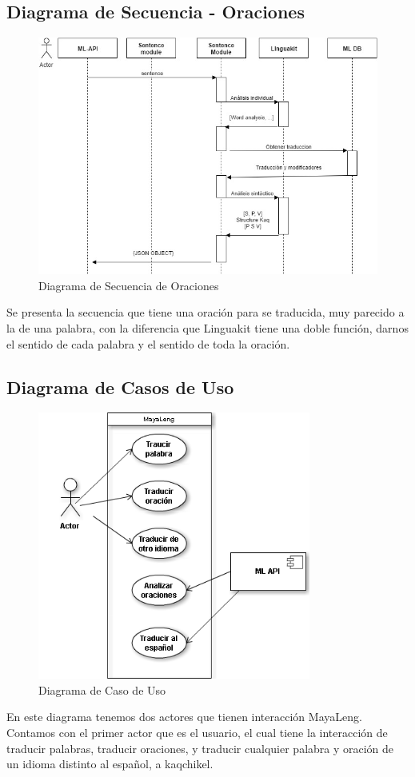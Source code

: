\documentclass[a4paper,openright,11pt]{article}
\begin{document}
\subsection{Diagrama de Secuencia - Oraciones}
\begin{figure}[H]
	\centering
	\includegraphics[width=1.1\textwidth]{secuenciaoracion}
	\caption{Diagrama de Secuencia de Oraciones}
	\label{fig:seco}
\end{figure}
Se presenta la secuencia que tiene una oración para se traducida, muy parecido a la de una palabra, con la diferencia que Linguakit tiene una doble función, darnos el sentido de cada palabra y el sentido de toda la oración.

\newpage
\subsection{Diagrama de Casos de Uso}
\begin{figure}[h]
	\centering
	\includegraphics[width=0.8\textwidth]{casouso}
	\caption{Diagrama de Caso de Uso}
	\label{fig:caso}
\end{figure}
En este diagrama tenemos dos actores que tienen interacción MayaLeng. Contamos con el primer actor que es el usuario, el cual tiene la interacción de traducir palabras, traducir oraciones, y traducir cualquier palabra y oración de un idioma distinto al español, a kaqchikel.
\newpage
\end{document}
